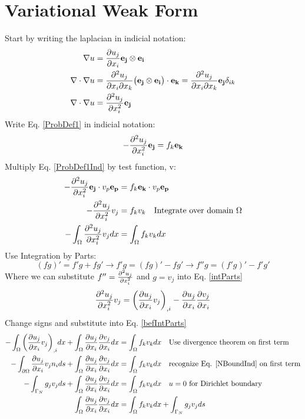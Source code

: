 \documentclass[12pt,3p]{article}
\begin{document}
\section{Variational Weak Form}
Start by writing the laplacian in indicial notation: 
\begin{align*}
\nabla u &= \pdv{u_j}{x_i} \mathbf{e_j} \otimes \mathbf{e_i} \\
\nabla \cdot \nabla u &= \pdv{u_j}{x_i}{x_k} \big( \mathbf{e_j} \otimes \mathbf{e_i} \big) \cdot \mathbf{e_k} = \pdv{u_j}{x_i}{x_k} \mathbf{e_j} \delta_{ik} \\
\nabla \cdot \nabla u &= \pdv[2]{u_j}{x_i} \mathbf{e_j}
\end{align*}
Write Eq. \ref{ProbDef1} in indicial notation: 
\begin{equation}\label{ProbDef1Ind}
- \pdv[2]{u_j}{x_i} \mathbf{e_j} = f_k \mathbf{e_k} 
\end{equation}
Multiply Eq. \ref{ProbDef1Ind} by test function, v: 
\begin{align}\label{befIntParts}
\begin{split}
- \pdv[2]{u_j}{x_i} \mathbf{e_j} \cdot v_p \mathbf{e_p} &= f_k \mathbf{e_k} \cdot v_p \mathbf{e_p} \\
						- \pdv[2]{u_j}{x_i} v_j &= f_k v_k \quad \text{Integrate over domain } \Omega\\
		      - \int_{\Omega} \pdv[2]{u_j}{x_i} v_j dx &= \int_{\Omega} f_k v_k dx 
\end{split}
\end{align}
Use Integration by Parts:
\begin{equation}\label{intParts}
(fg)' = f'g + fg' \rightarrow f'g = (fg)' - fg' \rightarrow f''g = (f'g)' - f'g'
\end{equation}
Where we can substitute $f'' = \pdv[2]{u_j}{x_i} $ and $g = v_j$ into Eq. \ref{intParts}
\begin{equation*}
\pdv[2]{u_j}{x_i} v_j = \bigg( \pdv{u_j}{x_i} v_j \bigg)_{,i} - \pdv{u_j}{x_i} \pdv{v_j}{x_i}
\end{equation*}
Change signs and substitute into Eq. \ref{befIntParts}
\begin{align}
\begin{split}
- \int_{\Omega} \bigg( \pdv{u_j}{x_i} v_j \bigg)_{,i} dx + \int_{\Omega} \pdv{u_j}{x_i} \pdv{v_j}{x_i} dx &= \int_{\Omega} f_k v_k dx \quad \text{Use divergence theorem on first term}\\
- \int_{\partial \Omega}  \pdv{u_j}{x_i} v_j n_i ds + \int_{\Omega} \pdv{u_j}{x_i} \pdv{v_j}{x_i} dx &= \int_{\Omega} f_k v_k dx \quad \text{recognize Eq. \ref{NBoundInd} on first term} \\
- \int_{\Gamma_N}  g_j v_j ds + \int_{\Omega} \pdv{u_j}{x_i} \pdv{v_j}{x_i} dx &= \int_{\Omega} f_k v_k dx \quad \text{$u = 0$ for Dirichlet boundary} \\
\int_{\Omega} \pdv{u_j}{x_i} \pdv{v_j}{x_i} dx &= \int_{\Omega} f_k v_k dx + \int_{\Gamma_N}  g_j v_j ds 
\end{split}
\end{align}
\end{document}
